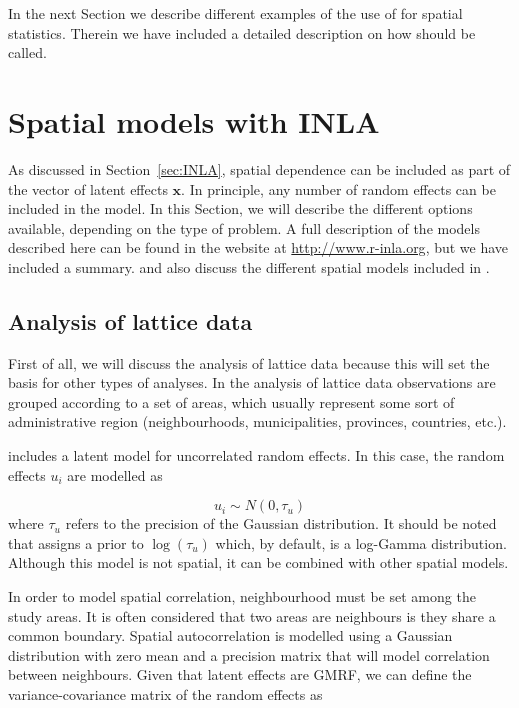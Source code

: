 \documentclass[article]{jss}
\begin{document}
In the next Section we describe different examples of the use of
 for spatial statistics. Therein we have included
a detailed description on how  should be called.

\section{Spatial models with INLA} \label{sec:spmodels}


As discussed in Section~\ref{sec:INLA}, spatial dependence can be included as
part of the vector of latent effects $\mathbf{x}$. In principle, any number of
random effects can be included in the model. In this Section, we will describe
the different options available, depending on the type of problem. A full
description of the models described here can be found in the 
website at \url{http://www.r-inla.org}, but we have included a summary.
\citet{Blangiardoetal:2013} and \citet{GomezRubioetal:2013} also discuss
the different spatial models included in .

\subsection{Analysis of lattice data}

First of all, we will discuss the analysis of lattice data because this will
set the basis for other types of analyses. In the analysis of lattice data
observations are grouped according to a set of areas, which usually represent
some sort of administrative region (neighbourhoods, municipalities, provinces,
countries, etc.).

 includes a latent model for uncorrelated random effects. In
this case, the random effects $u_i$ are modelled as

\begin{equation}
u_i \sim N(0, \tau_u)
\end{equation}
\noindent
where $\tau_u$ refers to the precision of the Gaussian distribution.  It should
be noted that  assigns a prior to $\log(\tau_u)$ which, by default,
is a log-Gamma  distribution.  Although this model is not spatial, it can be
combined with other spatial models.


In order to model spatial correlation, neighbourhood must be set among the
study areas.  It is often considered that two areas are neighbours is they
share a common boundary.  Spatial autocorrelation is modelled using a Gaussian
distribution with zero mean and a precision matrix that will model
correlation between neighbours. Given that latent effects are GMRF, 
we can define the variance-covariance matrix of the random effects
as
\end{document}
